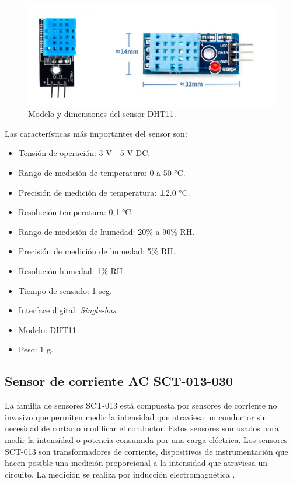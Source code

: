 \begin{figure}[htbp]
	\centering
	\includegraphics[width=.7\textwidth]{./Figures/dht11.jpg}
	\caption{Modelo y dimensiones del sensor DHT11. }

	\label{fig:dht11}
\end{figure}

Las características más importantes del sensor son:

\begin{itemize}
\item Tensión de operación: 3 V - 5 V DC.
\item Rango de medición de temperatura: 0 a 50 °C.
\item Precisión de medición de temperatura: ±2.0 °C.
\item Resolución temperatura: 0,1 °C.
\item Rango de medición de humedad: 20\% a 90\% RH.
\item Precisión de medición de humedad: 5\% RH.
\item Resolución humedad: 1\% RH
\item Tiempo de sensado: 1 seg.
\item Interface digital: \emph{Single-bus}.
\item Modelo: DHT11
\item Peso: 1 g.

\end{itemize}

\subsection{Sensor de corriente AC SCT-013-030}

La familia de sensores SCT-013 está compuesta por sensores de corriente no invasivo que permiten medir la intensidad que atraviesa un conductor sin necesidad de cortar o modificar el conductor. Estos sensores son usados para medir la intensidad o potencia consumida por una carga eléctrica. Los sensores SCT-013 son transformadores de corriente, dispositivos de instrumentación que hacen posible una medición proporcional a la intensidad que atraviesa un circuito. La medición se realiza por inducción electromagnética \citep{WEBSITE:9}. 


